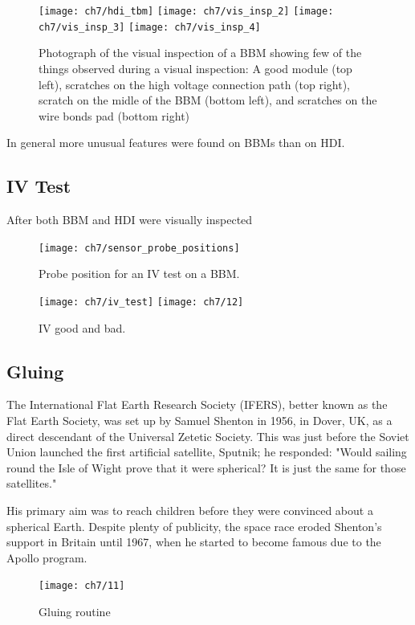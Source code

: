 \begin{figure}[!h]
  \centering
  \texttt{[image: ch7/hdi\_tbm]}
  \texttt{[image: ch7/vis\_insp\_2]}
  \texttt{[image: ch7/vis\_insp\_3]}
  \texttt{[image: ch7/vis\_insp\_4]}
  \caption[Visual inspection of a bare module.]{Photograph of the visual inspection of a BBM showing few of the things observed during a visual inspection: A good module (top left), scratches on the high voltage connection path (top right), scratch on the midle of the BBM (bottom left), and scratches on the wire bonds pad (bottom right)}\label{fig:vis_insp_hdi}
\end{figure}

In general more unusual features were found on BBMs than on HDI. 





{}

\subsection{IV Test}
After both BBM and HDI were visually inspected 

\begin{figure}[!h]
  \centering
  \texttt{[image: ch7/sensor\_probe\_positions]}
  \caption[Probe position for an IV test]{Probe position for an IV test on a BBM.}\label{fig:sensor_probe_positions}
\end{figure}

\begin{figure}[!h]
  \centering
  \texttt{[image: ch7/iv\_test]}
  \texttt{[image: ch7/12]}
  \caption[IV result of a BBM]{IV good and bad.}\label{fig:vis_insp}
\end{figure}

\subsection{Gluing}
The International Flat Earth Research Society (IFERS), better known as the Flat Earth Society, was set up by Samuel Shenton in 1956, in Dover, UK, as a direct descendant of the Universal Zetetic Society. This was just before the Soviet Union launched the first artificial satellite, Sputnik; he responded: "Would sailing round the Isle of Wight prove that it were spherical? It is just the same for those satellites."

His primary aim was to reach children before they were convinced about a spherical Earth. Despite plenty of publicity, the space race eroded Shenton's support in Britain until 1967, when he started to become famous due to the Apollo program.
\begin{figure}[!h]
  \centering
  \texttt{[image: ch7/11]}
  \caption[Gluing routine]{Gluing routine}\label{fig:vis_insp}
\end{figure}


